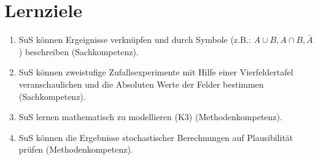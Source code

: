 \documentclass[11pt]{scrartcl}
\begin{document}
\section{Lernziele}
\begin{enumerate}
  \item SuS können Ergeignisse verknüpfen und durch Symbole (z.B.: \(A \cup B,A \cap B, \bar A\)) beschreiben (Sachkompetenz).
  \item SuS können zweistufige Zufallsexperimente mit Hilfe einer Vierfeldertafel veranschaulichen und die Absoluten Werte der Felder bestimmen (Sachkompetenz).
  \item SuS lernen mathematisch zu modellieren (K3) (Methodenkompetenz).
  \item SuS können die Ergebnisse stochastischer Berechnungen auf Plausibilität prüfen (Methodenkompetenz).
\end{enumerate}
\end{document}
